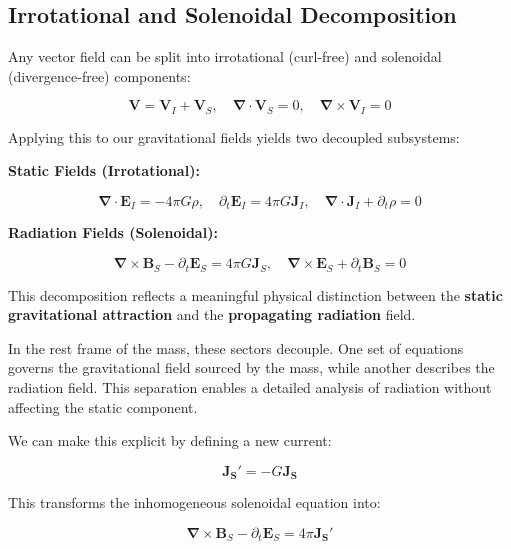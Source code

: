 \documentclass {article}
\renewcommand\vec{\mathbf}
\let\OldS\nabla
\renewcommand{\nabla}{\boldsymbol{\OldS}}
\begin{document}
\subsection{Irrotational and Solenoidal Decomposition}

Any vector field can be split into irrotational (curl-free) and solenoidal (divergence-free) components:

\begin{equation}
\vec{V} = \vec{V}_I + \vec{V}_S, \quad 
\nabla \cdot \vec{V}_S = 0, \quad 
\nabla \times \vec{V}_I = 0
\end{equation}

Applying this to our gravitational fields yields two decoupled subsystems:

\vspace{0.5em}
\noindent\textbf{Static Fields (Irrotational):}

\begin{equation}
\nabla \cdot \vec{E}_I = -4 \pi G \rho, \quad 
\partial_t \vec{E}_I = 4 \pi G \vec{J}_I, \quad 
\nabla \cdot \vec{J}_I + \partial_t \rho = 0
\end{equation}

\noindent\textbf{Radiation Fields (Solenoidal):}


\begin{equation}
\nabla \times \vec{B}_S - \partial_t \vec{E}_S = 4 \pi G \vec{J}_S, \quad 
\nabla \times \vec{E}_S + \partial_t \vec{B}_S = 0
\end{equation}

This decomposition reflects a meaningful physical distinction between the \textbf{static gravitational attraction} and the \textbf{propagating radiation} field.

In the rest frame of the mass, these sectors decouple. One set of equations governs the gravitational field sourced by the mass, while another describes the radiation field. This separation enables a detailed analysis of radiation without affecting the static component.

We can make this explicit by defining a new current:


\begin{equation}
\vec {J_S'} = - G \vec {J_S}
\end{equation}

This transforms the inhomogeneous solenoidal equation into:

\begin{equation}
\nabla \times \vec B_S - \partial_t \vec E_S =  4 \pi \vec {J_S'}
\end{equation}
\end{document}
